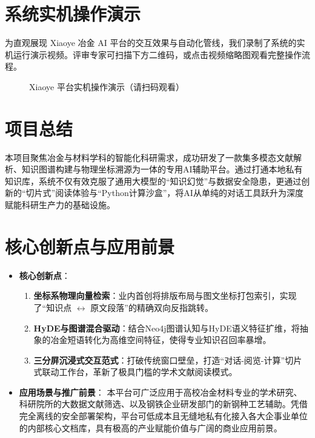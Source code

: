 \documentclass[a4paper, 12pt]{ctexart}
\begin{document}
\section{系统实机操作演示}
为直观展现 Xiaoye 冶金 AI 平台的交互效果与自动化管线，我们录制了系统的实机运行演示视频。评审专家可扫描下方二维码，或点击视频缩略图观看完整操作流程。

\begin{figure}[H]
    \centering
    \fbox{\rule{0pt}{2in} \rule{0.6\textwidth}{0pt}} %
    \caption{Xiaoye 平台实机操作演示（请扫码观看）}
    \label{fig:video_demo}
\end{figure}

\section{项目总结}
本项目聚焦冶金与材料学科的智能化科研需求，成功研发了一款集多模态文献解析、知识图谱构建与物理坐标溯源为一体的专用AI辅助平台。通过打通本地私有知识库，系统不仅有效克服了通用大模型的“知识幻觉”与数据安全隐患，更通过创新的“切片式”阅读体验与“Python计算沙盒”，将AI从单纯的对话工具跃升为深度赋能科研生产力的基础设施。

\section{核心创新点与应用前景}
\begin{itemize}
    \item \textbf{核心创新点}：
    \begin{enumerate}
        \item \textbf{坐标系物理向量检索}：业内首创将排版布局与图文坐标打包索引，实现了“知识点 $\leftrightarrow$ 原文段落”的精确双向反指跳转。
        \item \textbf{HyDE与图谱混合驱动}：结合Neo4j图谱认知与HyDE语义特征扩维，将抽象的冶金短语转化为高维空间特征，使得专业知识召回率暴增。
        \item \textbf{三分屏沉浸式交互范式}：打破传统窗口壁垒，打造“对话-阅览-计算”切片式联动工作台，革新了极具门槛的学术文献阅读模式。
    \end{enumerate}
    
    \item \textbf{应用场景与推广前景}：
    本平台可广泛应用于高校冶金材料专业的学术研究、科研院所的大数据文献筛选、以及钢铁企业研发部门的新钢种工艺辅助。凭借完全离线的安全部署架构，平台可低成本且无缝地私有化接入各大企事业单位的内部核心文档库，具有极高的产业赋能价值与广阔的商业应用前景。
\end{itemize}
\end{document}
